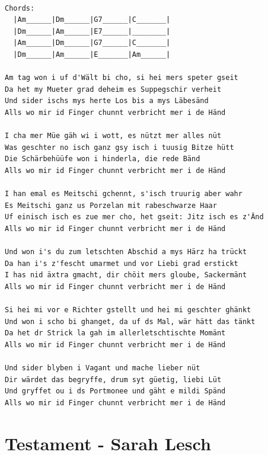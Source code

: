 \documentclass[
]{book}
\let\stdsection\section
\renewcommand\section{\clearpage\stdsection}
\begin{document}
\begin{verbatim}

Chords:
  |Am______|Dm______|G7______|C_______|
  |Dm______|Am______|E7______|________|
  |Am______|Dm______|G7______|C_______|
  |Dm______|Am______|E_______|Am______| 

Am tag won i uf d'Wält bi cho, si hei mers speter gseit
Da het my Mueter grad deheim es Suppegschir verheit
Und sider ischs mys herte Los bis a mys Läbesänd
Alls wo mir id Finger chunnt verbricht mer i de Händ

I cha mer Müe gäh wi i wott, es nützt mer alles nüt
Was geschter no isch ganz gsy isch i tuusig Bitze hütt
Die Schärbehüüfe won i hinderla, die rede Bänd
Alls wo mir id Finger chunnt verbricht mer i de Händ

I han emal es Meitschi gchennt, s'isch truurig aber wahr
Es Meitschi ganz us Porzelan mit rabeschwarze Haar
Uf einisch isch es zue mer cho, het gseit: Jitz isch es z'Änd
Alls wo mir id Finger chunnt verbricht mer i de Händ

Und won i's du zum letschten Abschid a mys Härz ha trückt
Da han i's z'fescht umarmet und vor Liebi grad erstickt
I has nid äxtra gmacht, dir chöit mers gloube, Sackermänt
Alls wo mir id Finger chunnt verbricht mer i de Händ

Si hei mi vor e Richter gstellt und hei mi geschter ghänkt
Und won i scho bi ghanget, da uf ds Mal, wär hätt das tänkt
Da het dr Strick la gah im allerletschtischte Momänt
Alls wo mir id Finger chunnt verbricht mer i de Händ

Und sider blyben i Vagant und mache lieber nüt
Dir wärdet das begryffe, drum syt güetig, liebi Lüt
Und gryffet ou i ds Portmonee und gäht e mildi Spänd
Alls wo mir id Finger chunnt verbricht mer i de Händ
\end{verbatim}

\hypertarget{mundart-und-deutsch-das-testament}{%
\section{Testament - Sarah Lesch}\label{mundart-und-deutsch-das-testament}}
\end{document}
